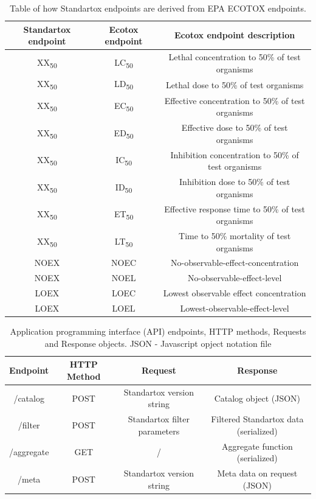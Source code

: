 \documentclass[journal,datadescriptor,submit,moreauthors,pdftex]{Definitions/mdpi}
\begin{document}
\begin{table}[H]
    \caption{Table of how Standartox endpoints are derived from EPA ECOTOX endpoints.}
    \label{tab:endpoints-conflate}
    \centering
\begin{tabular}{ccc}
    \toprule
    \textbf{Standartox endpoint} & \textbf{Ecotox endpoint} & \textbf{Ecotox endpoint description} \\
    \midrule
    XX\textsubscript{50} & LC\textsubscript{50} & Lethal concentration to 50\% of test organisms \\
    XX\textsubscript{50} & LD\textsubscript{50} & Lethal dose to 50\% of test organisms \\
    XX\textsubscript{50} & EC\textsubscript{50} & Effective concentration to 50\% of test organisms \\
    XX\textsubscript{50} & ED\textsubscript{50} & Effective dose to 50\% of test organisms \\
    XX\textsubscript{50} & IC\textsubscript{50} & Inhibition concentration to 50\% of test organisms \\
    XX\textsubscript{50} & ID\textsubscript{50} & Inhibition dose to 50\% of test organisms \\
    XX\textsubscript{50} & ET\textsubscript{50} & Effective response time to 50\% of test organisms \\
    XX\textsubscript{50} & LT\textsubscript{50} & Time to 50\% mortality of test organisms \\
    NOEX & NOEC & No-observable-effect-concentration \\
    NOEX & NOEL & No-observable-effect-level \\
    LOEX & LOEC & Lowest observable effect concentration\\
    LOEX & LOEL & Lowest-observable-effect-level \\
    \bottomrule
\end{tabular}
\end{table}

\begin{table}[H]
    \caption{Application programming interface (API) endpoints, HTTP methods, Requests and Response objects. JSON - Javascript opject notation file}
    \label{tab:api-endpoints}
    \centering
\begin{tabular}{cccc}
    \toprule
    \textbf{Endpoint} & \textbf{HTTP Method} & \textbf{Request} & \textbf{Response} \\
    \midrule
    /catalog & POST & Standartox version string & Catalog object (JSON) \\
    /filter & POST & Standartox filter parameters & Filtered Standartox data (serialized) \\
    /aggregate & GET & / & Aggregate function (serialized) \\
    /meta & POST & Standartox version string & Meta data on request (JSON) \\
    \bottomrule
\end{tabular}
\end{table}
\end{document}
